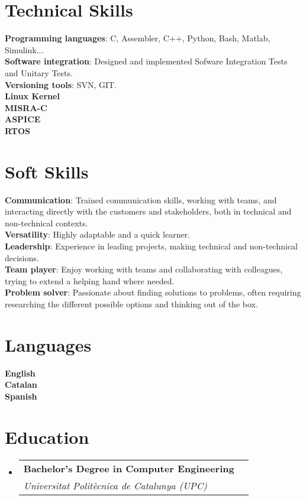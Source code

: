 \documentclass[letterpaper,11pt]{article}
\makeatletter
\newcommand{\resumeSubheading}[4]{
  \vspace{-2pt}\item
    \begin{tabular*}{0.97\textwidth}[t]{l@{\extracolsep{\fill}}r}
      \textbf{#1} & #2 \\
      \textit{\small#3} & \textit{\small #4} \\
    \end{tabular*}\vspace{-7pt}
}
\newcommand{\resumeSubHeadingListStart}{\begin{itemize}[leftmargin=0.15in, label={}]}
\newcommand{\resumeSubHeadingListEnd}{\end{itemize}}
\makeatother
\begin{document}
%
\section{Technical Skills}
 \begin{itemize}[leftmargin=0.15in, label={}]
    \small{\item{
     \textbf{Programming languages}{: C, Assembler, C++, Python, Bash, Matlab, Simulink...} \\
     \textbf{Software integration}{: Designed and implemented Sofware Integration Tests and Unitary Tests.} \\
     \textbf{Versioning tools}{: SVN, GIT.} \\
     \textbf{Linux Kernel}{} \\
     \textbf{MISRA-C}{} \\
     \textbf{ASPICE}{} \\
     \textbf{RTOS}{} \\

    }}
 \end{itemize}

\section{Soft Skills}
 \begin{itemize}[leftmargin=0.15in, label={}]
    \small{\item{
     \textbf{Communication}{: Trained communication skills, working with teams, and interacting directly with the customers and stakeholders, both in technical and non-technical contexts. } \\
     \textbf{Versatility}{: Highly adaptable and a quick learner.} \\
     \textbf{Leadership}{: Experience in leading projects, making technical and non-technical decisions.} \\
     \textbf{Team player}{: Enjoy working with teams and collaborating with colleagues, trying to extend a helping hand where needed.} \\
     \textbf{Problem solver}{: Passionate about finding solutions to problems, often requiring researching the different possible options and thinking out of the box.} \\
    }}
 \end{itemize}

\section{Languages}
 \begin{itemize}[leftmargin=0.15in, label={}]
    \small{\item{
     \textbf{English}{ } \\
     \textbf{Catalan}{ } \\
     \textbf{Spanish}{ } \\
    }}
 \end{itemize}

\section{Education}
  \resumeSubHeadingListStart
    \resumeSubheading
      {Bachelor's Degree in Computer Engineering}{}
      {Universitat Politècnica de Catalunya (UPC)}{}
  \resumeSubHeadingListEnd


\end{document}
